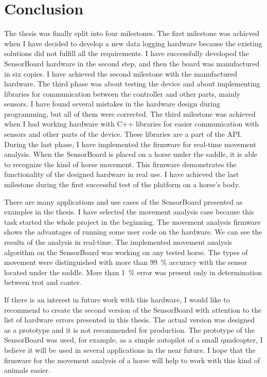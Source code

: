 \chapter{Conclusion}
The thesis was finally split into four milestones. The first milestone was achieved when I have decided to develop a new data logging hardware because the existing solutions did not fulfill all the requirements. I have successfully developed the SensorBoard hardware in the second step, and then the board was manufactured in six copies. I have achieved the second milestone with the manufactured hardware. The third phase was about testing the device and about implementing libraries for communication between the controller and other parts, mainly sensors. I have found several mistakes in the hardware design during programming, but all of them were corrected. The third milestone was achieved when I had working hardware with C++ libraries for easier communication with sensors and other parts of the device. These libraries are a part of the API. During the last phase, I have implemented the firmware for real-time movement analysis. When the SensorBoard is placed on a horse under the saddle, it is able to recognize the kind of horse movement. This firmware demonstrates the functionality of the designed hardware in real use. I have achieved the last milestone during the first successful test of the platform on a horse's body.

There are many applications and use cases of the SensorBoard presented as examples in the thesis. I have selected the movement analysis case because this task started the whole project in the beginning. The movement analysis firmware shows the advantages of running some user code on the hardware. We can see the results of the analysis in real-time. The implemented movement analysis algorithm on the SensorBoard was working on any tested horse. The types of movement were distinguished with more than \SI{99}{\%} accuracy with the sensor located under the saddle. More than \SI{1}{\%} error was present only in determination between trot and canter.

If there is an interest in future work with this hardware, I would like to recommend to create the second version of the SensorBoard with attention to the list of hardware errors presented in this thesis. The actual version was designed as a prototype and it is not recommended for production. The prototype of the SensorBoard was used, for example, as a simple autopilot of a small quadcopter, I believe it will be used in several applications in the near future. I hope that the firmware for the movement analysis of a horse will help to work with this kind of animals easier.

